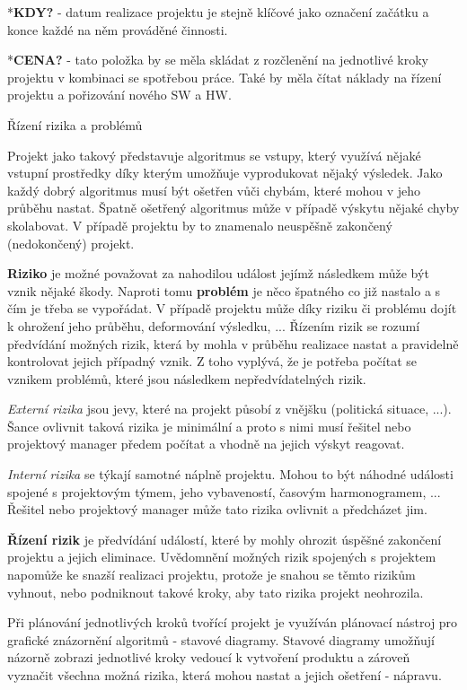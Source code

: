 *{\bf KDY?} - datum realizace projektu je stejně klíčové jako označení začátku a konce každé na něm prováděné činnosti.

*{\bf CENA?} - tato položka by se měla skládat z rozčlenění na jednotlivé kroky projektu v kombinaci se spotřebou práce. Také by měla čítat náklady na řízení projektu a pořizování nového SW a HW.
\enditems

\sec Řízení rizika a problémů

Projekt jako takový představuje algoritmus se vstupy, který využívá nějaké vstupní prostředky díky kterým umožňuje vyprodukovat nějaký výsledek. Jako každý dobrý algoritmus musí být ošetřen vůči chybám, které mohou v jeho průběhu nastat. Špatně ošetřený algoritmus může v případě výskytu nějaké chyby skolabovat. V případě projektu by to znamenalo neuspěšně zakončený (nedokončený) projekt.

{\bf Riziko} je možné považovat za nahodilou událost jejímž následkem může být vznik nějaké škody. Naproti tomu {\bf problém} je něco špatného co již nastalo a s čím je třeba se vypořádat. V případě projektu může díky riziku či problému dojít k ohrožení jeho průběhu, deformování výsledku, ... Řízením rizik se rozumí předvídání možných rizik, která by mohla v průběhu realizace nastat a pravidelně kontrolovat jejich případný vznik. Z toho vyplývá, že je potřeba počítat se vznikem problémů, které jsou následkem nepředvídatelných rizik.

{\it Externí rizika} jsou jevy, které na projekt působí z vnějšku (politická situace, ...). Šance ovlivnit taková rizika je minimální a proto s nimi musí řešitel nebo projektový manager předem počítat a vhodně na jejich výskyt reagovat.

{\it Interní rizika} se týkají samotné náplně projektu. Mohou to být náhodné události spojené s projektovým týmem, jeho vybaveností, časovým harmonogramem, ... Řešitel nebo projektový manager může tato rizika ovlivnit a předcházet jim.

{\bf Řízení rizik} je předvídání událostí, které by mohly ohrozit úspěšné zakončení projektu a jejich eliminace. Uvědomnění možných rizik spojených s projektem napomůže ke snazší realizaci projektu, protože je snahou se těmto rizikům vyhnout, nebo podniknout takové kroky, aby tato rizika projekt neohrozila.

Při plánování jednotlivých kroků tvořící projekt je využíván plánovací nástroj pro grafické znázornění algoritmů - stavové diagramy. Stavové diagramy umožňují názorně zobrazi jednotlivé kroky vedoucí k vytvoření produktu  a zároveň vyznačit všechna možná rizika, která mohou nastat a jejich ošetření - nápravu.

